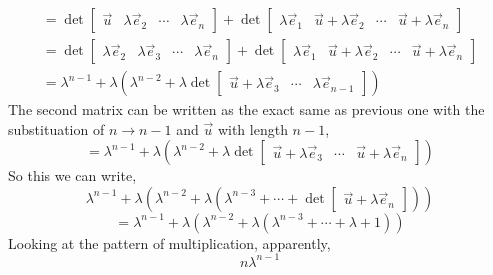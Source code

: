 \documentclass[letter]{article}
\begin{document}
\begin{align*}
	= \det \begin{bmatrix} \vec{u} & 
	\lambda \vec{e}_2 & \cdots & \lambda \vec{e}_n \end{bmatrix} 
	+ 
	\det 
	\begin{bmatrix} \lambda \vec{e}_1 
	& 
	\vec{u}+\lambda \vec{e}_2 
	& \cdots &  
\vec{u} + \lambda \vec{e}_{n} \end{bmatrix} \\
= 
\det 
\begin{bmatrix} \lambda \vec{e}_2 
& 
\lambda \vec{e}_3 & 
\cdots 
		  & 
\lambda \vec{e}_n \end{bmatrix} 
+ 
\det 
		\begin{bmatrix} \lambda \vec{e}_1 & 
		\vec{u} + \lambda \vec{e}_2 & 
	\cdots 
					    & 
	\vec{u}+ \lambda \vec{e}_n \end{bmatrix} 
	\\
	=
\lambda^{n - 1}  + 
\lambda \left( \lambda ^{n-2} + \lambda \det 
		\begin{bmatrix} \vec{u}+ \lambda \vec{e}_3 & \cdots & \lambda \vec{e}_{n-1} \end{bmatrix} \right)
\end{align*}
The second matrix can be written as the exact same as previous one with the substituation of $n \to  n - 1$ and $\vec{u}$ with length $n-1$, 
\[
= \lambda^{n-1} +
\lambda \left(
\lambda ^{n-2} + \lambda \det \begin{bmatrix} \vec{u} + 
\lambda \vec{e}_3 & \cdots & \vec{u}+ \lambda \vec{e}_n\end{bmatrix} 
\right)
\] 
So this we can write, 
\[
\lambda ^{n-1} + \lambda 
\left(\lambda ^{n-2} + \lambda \left(\lambda ^{n-3} + \cdots + \det \begin{bmatrix} \vec{u}+\lambda \vec{e}_n \end{bmatrix} \right)\right)
\]
\[
= \lambda^{n-1} + \lambda 
\left(\lambda^{n-2} + \lambda
\left(\lambda^{n-3} + \cdots + \lambda + 1\right)\right)
\]
Looking at the pattern of multiplication, apparently, 
\[
\boxed{
n \lambda ^{n-1}
}
\] 

	
\end{document}
